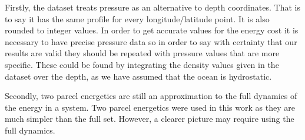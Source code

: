Firstly, the \citet{WOCE2002} dataset treats pressure as an alternative to depth coordinates. That is to say it has the same profile for every longitude/latitude point. It is also rounded to integer values. In order to get accurate values for the energy cost it is necessary to have precise pressure data so in order to say with certainty that our results are valid they should be repeated with pressure values that are more specific. These could be found by integrating the density values given in the dataset over the depth, as we have assumed that the ocean is hydrostatic.

Secondly, two parcel energetics are still an approximation to the full dynamics of the energy in a system. Two parcel energetics were used in this work as they are much simpler than the full set. However, a clearer picture may require using the full dynamics. 